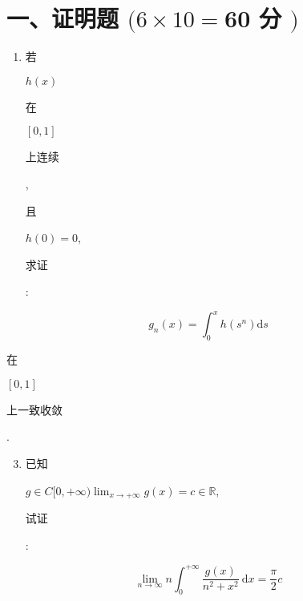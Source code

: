 \documentclass[10pt]{article}
\begin{document}
\section{一、证明题 $(6 \times 10=\mathbf{6 0}$ 分 $)$}
\begin{enumerate}
  \item \begin{CJK}{UTF8}{mj}若\end{CJK} $h(x)$ \begin{CJK}{UTF8}{mj}在\end{CJK} $[0,1]$ \begin{CJK}{UTF8}{mj}上连续\end{CJK}, \begin{CJK}{UTF8}{mj}且\end{CJK} $h(0)=0$, \begin{CJK}{UTF8}{mj}求证\end{CJK}:
\end{enumerate}
$$
g_{n}(x)=\int_{0}^{x} h\left(s^{n}\right) \mathrm{d} s
$$
\begin{CJK}{UTF8}{mj}在\end{CJK} $[0,1]$ \begin{CJK}{UTF8}{mj}上一致收敛\end{CJK}.

\begin{enumerate}
  \setcounter{enumi}{2}
  \item \begin{CJK}{UTF8}{mj}已知\end{CJK} $g \in C[0,+\infty) \lim _{x \rightarrow+\infty} g(x)=c \in \mathbb{R}$, \begin{CJK}{UTF8}{mj}试证\end{CJK}:
\end{enumerate}
$$
\lim _{n \rightarrow \infty} n \int_{0}^{+\infty} \frac{g(x)}{n^{2}+x^{2}} \mathrm{~d} x=\frac{\pi}{2} c
$$
\end{document}
